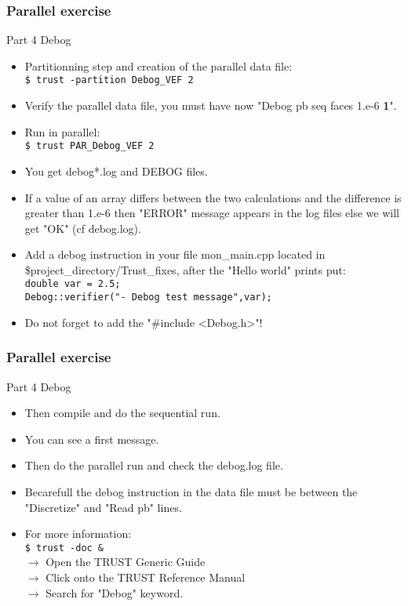 \documentclass[10pt, hyperref={unicode=true,pdfusetitle, bookmarks=true,bookmarksnumbered=false,bookmarksopen=false, breaklinks=false,pdfborder={0 0 1},backref=true,colorlinks=true,linkcolor=darkblue,pageanchor, urlcolor=darkblue}]{beamer}
\begin{document}
\begin{frame}
\frametitle{Parallel exercise}
\begin{block}{Part 4 Debog}

\begin{itemize}
\item Partitionning step and creation of the parallel data file:\\
\texttt{\$ trust -partition Debog\_VEF 2 }\\
\item Verify the parallel data file, you must have now "Debog pb seq faces 1.e-6 \textbf{1}".
\item Run in parallel:\\
\texttt{\$ trust PAR\_Debog\_VEF 2 }\\
\item You get debog*.log and DEBOG files.
\item If a value of an array differs between the two calculations and the difference is greater than 1.e-6 then "ERROR" message appears in the log files else we will get "OK" (cf debog.log).\\

\item Add a debog instruction in your file mon\_main.cpp located in \$project\_directory/Trust\_fixes, after the "Hello world" prints put:\\
\texttt{double var = 2.5;}\\
\texttt{Debog::verifier("- Debog test message",var);}

\item Do not forget to add the "\#include <Debog.h>"!
\end{itemize}

\end{block}
\end{frame}
\begin{frame}
\frametitle{Parallel exercise}
\begin{block}{Part 4 Debog}

\begin{itemize}
\item Then compile and do the sequential run.
\item You can see a first message.
\item Then do the parallel run and check the debog.log file.
\item Becarefull the debog instruction in the data file must be between the "Discretize" and "Read pb" lines.
\item For more information:\\
\texttt{\$ trust -doc \&} \\
$\rightarrow$ Open the TRUST Generic Guide\\
$\rightarrow$ Click onto the TRUST Reference Manual\\
$\rightarrow$ Search for "Debog" keyword.
\end{itemize}

\end{block}
\end{frame}
\end{document}
